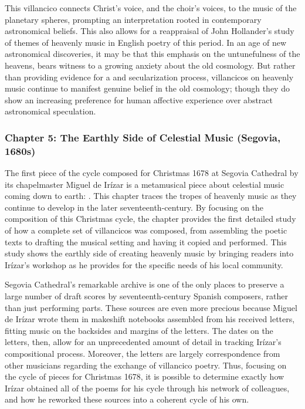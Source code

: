 \documentclass{vcbook-proposal}
\begin{document}
This villancico connects Christ's voice, and the choir's voices, to the music 
of the planetary spheres, prompting an interpretation rooted in contemporary 
astronomical beliefs.
This also allows for a reappraisal of John Hollander's study of themes of
heavenly music in English poetry of this period.%
  \Autocite{Hollander:Untuning}
In an age of new astronomical discoveries, it may be that this emphasis on the 
untunefulness of the heavens, bears witness to a growing anxiety about the old 
cosmology.
But rather than providing evidence for a  and secularization
process, villancicos on heavenly music continue to manifest genuine belief in
the old cosmology; though they do show an increasing preference for human affective
experience over abstract astronomical speculation.


\subsubsection{Chapter 5: The Earthly Side of Celestial Music (Segovia, 1680s)}

The first piece of the cycle composed for Christmas 1678 at Segovia Cathedral by
its chapelmaster Miguel de Irízar is a metamusical piece about celestial music
coming down to earth: .
This chapter traces the tropes of heavenly music as they continue to develop in
the later seventeenth-century. 
By focusing on the composition of this Christmas cycle, the chapter
provides the first detailed study of how a complete set of villancicos was
composed, from assembling the poetic texts to drafting the musical setting and
having it copied and performed.
This study shows the earthly side of creating heavenly music by bringing
readers into Irízar's workshop as he provides for the specific needs of his
local community.

Segovia Cathedral's remarkable archive is one of the only places to preserve a 
large number of draft scores by seventeenth-century Spanish composers, rather 
than just performing parts.
These sources are even more precious because Miguel de Irízar wrote them in
makeshift notebooks assembled from his received letters, fitting music on the
backsides and margins of the letters.
The dates on the letters, then, allow for an unprecedented amount of detail in
tracking Irízar's compositional process.
Moreover, the letters are largely correspondence from other musicians regarding 
the exchange of villancico poetry.
Thus, focusing on the cycle of pieces for Christmas 1678, it is possible to 
determine exactly how Irízar obtained all of the poems for his cycle through 
his network of colleagues, and how he reworked these sources into a coherent 
cycle of his own.
\end{document}
